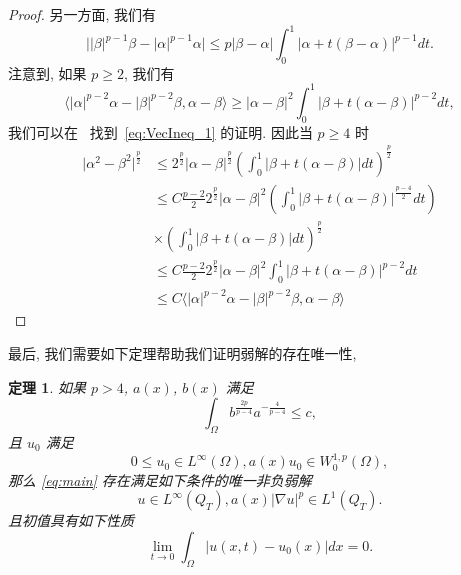 \documentclass[twoside,longtitle]{LZUthesis}
\newtheorem{theorem}{定理}[chapter]
\theoremstyle{definition}
\numberwithin{equation}{chapter}
\newcommand*\abs[1]{\lvert#1\rvert}
\begin{document}
\begin{proof}
	另一方面, 我们有
	\begin{equation}
		\abs{\abs{\beta}^{p-1}\beta - \abs{\alpha}^{p-1}\alpha} \leq p\abs{\beta-\alpha}\int_0^1 \abs{\alpha + t(\beta - \alpha)}^{p-1}dt.
	\end{equation}
	注意到, 如果 $p \geq 2$, 我们有
	\begin{equation}\label{eq:VecIneq_1}
		\langle \abs{\alpha}^{p-2}\alpha - \abs{\beta}^{p-2}\beta, \alpha-\beta\rangle
		\geq \abs{\alpha-\beta}^2\int_0^1 \abs{\beta + t(\alpha - \beta)}^{p-2}dt,
	\end{equation}
	我们可以在~\cite{lindqvistNotesStationaryPLaplace2019} 找到~\cref{eq:VecIneq_1} 的证明.
	因此当 $p \geq 4$ 时
	\begin{equation}
		\begin{split}
			\abs{\alpha^2 - \beta^2}^{\frac{p}{2}}
			&\leq 2^{\frac{p}{2}}\abs{\alpha-\beta}^{\frac{p}{2}}
			\left(\int_0^1 \abs{\beta + t(\alpha - \beta)}dt\right)^{\frac{p}{2}}\\
			&\leq C\frac{p-2}{2}2^{\frac{p}{2}}\abs{\alpha-\beta}^2
			\left(\int_0^1 \abs{\beta + t(\alpha - \beta)}^{\frac{p-4}{2}}dt\right)\\
			&\times\left(\int_0^1 \abs{\beta + t(\alpha - \beta)}dt\right)^{\frac{p}{2}}\\
			&\leq C\frac{p-2}{2}2^{\frac{p}{2}}\abs{\alpha-\beta}^2
			\int_0^1 \abs{\beta + t(\alpha - \beta)}^{p-2}dt\\
			&\leq C \langle \abs{\alpha}^{p-2}\alpha - \abs{\beta}^{p-2}\beta, \alpha-\beta\rangle
		\end{split}
	\end{equation}
\end{proof}

最后, 我们需要如下定理帮助我们证明弱解的存在唯一性,
\begin{theorem}\cite[定理 1.3 和 1.6]{Zhan2019Uniquenessa}\label{thm:zhan}
	如果 $p>4$, $a(x)$, $b(x)$ 满足
	\begin{equation}\label{eq:zhan_intcondition}
		\int_{\Omega} b^{\frac{2p}{p-4}}a^{-\frac{4}{p-4}} \leq c,
	\end{equation}
	且 $u_0$ 满足
	\begin{equation}\label{eq:zhan_initdata}
		0 \leq u_0 \in L^{\infty}(\Omega), a(x)u_0 \in W_0^{1,p}(\Omega),
	\end{equation}
	那么 \cref{eq:main} 存在满足如下条件的唯一非负弱解
	\begin{equation}
		u \in L^{\infty}(Q_T), a(x)\abs{\nabla u}^p \in L^1(Q_T).
	\end{equation}
	且初值具有如下性质
	\begin{equation}
		\lim_{t \to 0}\int_{\Omega}\abs{u(x,t) - u_0(x)}dx = 0.
	\end{equation}
\end{theorem}
\end{document}
